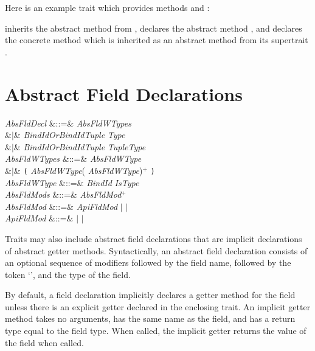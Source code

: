 Here is an example trait  which provides methods
 and :

inherits the abstract method  from ,
declares the abstract method , and
declares the concrete method 
which is inherited as an abstract method
from its supertrait .





\section{Abstract Field Declarations}

\begin{Grammar}
\emph{AbsFldDecl}
&::=&  \emph{AbsFldWTypes}\\
&$|$&  \emph{BindIdOrBindIdTuple} \EXP{\mathrel{\mathtt{:}}} \emph{Type}\\
&$|$&  \emph{BindIdOrBindIdTuple} \EXP{\mathrel{\mathtt{:}}} \emph{TupleType}\\

\emph{AbsFldWTypes} &::=& \emph{AbsFldWType} \\
&$|$& \texttt{(} \emph{AbsFldWType}(\EXP{,} \emph{AbsFldWType})$^+$ \texttt{)}\\

\emph{AbsFldWType} &::=& \emph{BindId} \emph{IsType}\\

\emph{AbsFldMods} &::=& \emph{AbsFldMod}$^+$\\

\emph{AbsFldMod} &::=& \emph{ApiFldMod} $|$  $|$ \\

\emph{ApiFldMod} &::=&  $|$  $|$ \\

\end{Grammar}


Traits may also include abstract field declarations that are implicit
declarations of abstract getter methods.
Syntactically, an abstract field declaration consists of an optional
sequence of modifiers followed by the field name, followed by the token
`\EXP{\COLONOP}', and the type of the field.


By default, a field declaration implicitly
declares a getter method for the field unless there is an explicit
getter declared in the enclosing trait.
An implicit getter method takes no arguments, has the same name as the
field, and has a return type equal to the field type.  When called, the
implicit getter returns the value of the field when called.




